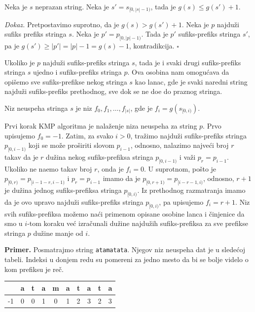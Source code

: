 \begin{thm}
\label{sufiksprefiksteorema}
Neka je $s$ neprazan string. Neka je $s' = s_{[0, |s|-1)}$, tada je $g(s) \leq g(s') + 1$.
\end{thm}

\textit{Dokaz.} Pretpostavimo suprotno, da je $g(s) > g(s') + 1$. Neka je $p$ najdu\v zi sufiks prefiks stringa $s$. Neka je $p' = p_{[0, |p|-1)}$. Tada je $p'$ sufiks-prefiks stringa $s'$, pa je $g(s') \geq |p'| = |p| - 1 = g(s) - 1$, kontradikcija. \hfill $\square$

Ukoliko je $p$ najdu\v zi sufiks-prefiks stringa $s$, tada je i svaki drugi sufiks-prefiks stringa $s$ ujedno i sufiks-prefiks stringa $p$. Ova osobina nam omogu\' cava da opi\v semo sve sufiks-prefikse nekog stringa $s$ kao lanac, gde je svaki naredni string najdu\v zi sufiks-prefiks prethodnog, sve dok se ne do\dj e do praznog stringa.

\begin{dfn}
Niz neuspeha stringa $s$ je niz $f_0, f_1, \ldots, f_{|s|}$, gde je $f_i = g(s_{[0, i)})$.
\end{dfn}

Prvi korak KMP algoritma je nala\v zenje niza neuspeha za string $p$. Prvo upisujemo $f_0 = -1$. Zatim, za svako $i > 0$, tra\v zimo najdu\v zi sufiks-prefiks stringa $p_{[0, i-1)}$ koji se mo\v ze pro\v siriti slovom $p_{i-1}$, odnosno, nalazimo najve\' ci broj $r$ takav da je $r$ du\v zina nekog sufiks-prefiksa stringa $p_{[0, i-1)}$ i va\v zi $p_r = p_{i-1}$. Ukoliko ne na\dj emo takav broj $r$, onda je $f_i = 0$. U suprotnom, po\v sto je $p_{[0, r)} = p_{[i-1-r, i-1)}$ i $p_r = p_{i-1}$ imamo da je $p_{[0, r+1)} = p_{[i-r-1, i)}$, odnosno, $r+1$ je du\v zina jednog sufiks-prefiksa stringa $p_{[0, i)}$. Iz prethodnog razmatranja imamo da je ovo upravo najdu\v zi sufiks-prefiks stringa $p_{[0,i)}$, pa upisujemo $f_i = r+1$. Niz svih sufiks-prefiksa mo\v zemo na\' ci primenom opisane osobine lanca i \v cinjenice da smo u $i$-tom koraku ve\' c izra\v cunali du\v zine najdu\v zih sufiks-prefiksa za sve prefikse stringa $p$ du\v zine manje od $i$.

\noindent \textbf{Primer.} Posmatrajmo string \texttt{atamatata}. Njegov niz neuspeha dat je u slede\' coj tabeli. Indeksi u donjem redu su pomereni za jedno mesto da bi se bolje videlo o kom prefiksu je re\v c.
\begin{center}
\begin{tabular}{|c|c|c|c|c|c|c|c|c|c|}
    \hline
    & a & t & a & m & a & t & a & t & a \\
    \hline
 -1 & 0 & 0 & 1 & 0 & 1 & 2 & 3 & 2 & 3 \\
    \hline
\end{tabular}
\end{center}

